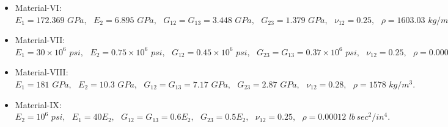 \documentclass[3p,preprint,12pt]{elsarticle}
\begin{document}
\begin{itemize}
	\item Material-VI: \cite{tran2015geometrically}\\
	$
	E_{1}=172.369\,\,GPa,\,\,\,\,E_{2}=6.895\,\,GPa,\,\,\,\,G_{12}=G_{13}=3.448\,\,GPa,\,\,\,\,G_{23}=1.379\,\,GPa,\,\,\,\,\nu_{12}=0.25,\,\,\,\,\rho=1603.03\,\,kg/m^3.
	$
	\item Material-VII: \cite{nosier1990effects}\\
	$
	E_{1}=30\times10^6\,\,psi,\,\,\,\,E_{2}=0.75\times10^6\,\,psi,\,\,\,\,G_{12}=0.45\times10^6\,\,psi,\,\,\,\,G_{23}=G_{13}=0.37\times10^6\,\,psi,\,\,\,\,\nu_{12}=0.25,\,\,\,\,\rho=0.000143\,\,lb\,sec^2/in^4.
	$		
	
	\item Material-VIII: \cite{kulkarni2008free}\\
	$
	E_{1}=181\,\,GPa,\,\,\,\,E_{2}=10.3\,\,GPa,\,\,\,\,G_{12}=G_{13}=7.17\,\,GPa,\,\,\,\,G_{23}=2.87\,\,GPa,\,\,\,\,\nu_{12}=0.28,\,\,\,\,\rho=1578\,\,kg/m^3.
	$
	
	\item Material-IX: \cite{khdeir1988dynamic}\\
	$
	E_{2}=10^{6}\,\,psi,\,\,\,\,E_{1}=40E_{2},\,\,\,\,G_{12}=G_{13}=0.6E_{2},\,\,\,\,G_{23}=0.5E_{2},\,\,\,\,\nu_{12}=0.25,\,\,\,\,\rho=0.00012\,\,lb\,sec^2/in^4.
	$
	
\end{itemize}
\end{document}
